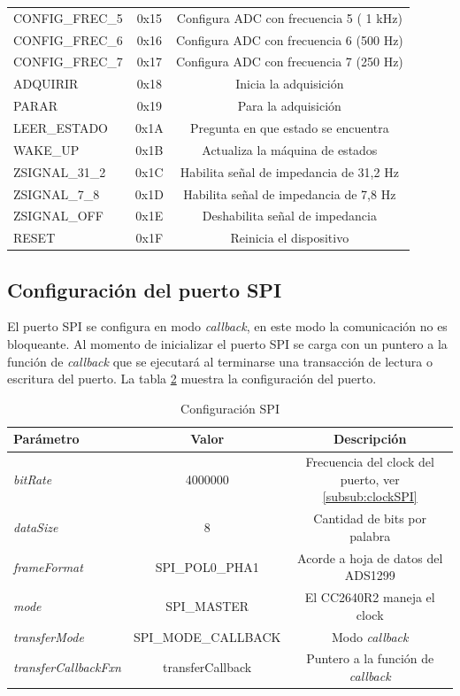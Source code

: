\begin{table}[h]
\begin{tabular}{l c c}
CONFIG\_FREC\_5    &	0x15	&	Configura ADC con frecuencia 5 ( 1 kHz)\\
CONFIG\_FREC\_6    &	0x16	&	Configura ADC con frecuencia 6 (500 Hz)\\
CONFIG\_FREC\_7	&	0x17	&	Configura ADC con frecuencia 7 (250 Hz)\\
ADQUIRIR			&	0x18	&	Inicia la adquisición\\
PARAR           	&	0x19	&	Para la adquisición\\
LEER\_ESTADO		&	0x1A	&	Pregunta en que estado se encuentra\\
WAKE\_UP       	&	0x1B	&	Actualiza la máquina de estados\\
ZSIGNAL\_31\_2	&	0x1C	&	Habilita señal de impedancia de 31,2 Hz\\
ZSIGNAL\_7\_8	&	0x1D	&	Habilita señal de impedancia de 7,8 Hz\\
ZSIGNAL\_OFF		&	0x1E	&	Deshabilita señal de impedancia\\
RESET			&	0x1F	&	Reinicia el dispositivo\\

\bottomrule
\hline
\end{tabular}
\label{tab:Comandos}
\end{table}


\subsection{Configuración del puerto SPI}
El puerto SPI se configura en modo \textit{callback}, en este modo la comunicación no es bloqueante. Al momento de inicializar el puerto SPI se carga con un puntero a la función de \textit{callback} que se ejecutará al terminarse una transacción de lectura o escritura del puerto. La tabla \ref{tab:ParamSPI} muestra la configuración del puerto.

\begin{table}[h]
\centering
\caption[Configuración SPI]{Configuración SPI}
\begin{tabular}{l c c}
\toprule
\textbf{Parámetro} & \textbf{Valor} & \textbf{Descripción}\\
\midrule
\textit{bitRate}              & 4000000 & Frecuencia del clock del puerto, ver \ref{subsub:clockSPI}\\ 
\textit{dataSize}             & 8 & Cantidad de bits por palabra\\
\textit{frameFormat}          & SPI\_POL0\_PHA1 & Acorde a hoja de datos del ADS1299 \citep{PART:ADS1299}\\
\textit{mode}                 & SPI\_MASTER & El CC2640R2 maneja el clock\\
\textit{transferMode}         & SPI\_MODE\_CALLBACK & Modo \textit{callback}\\
\textit{transferCallbackFxn}  & transferCallback & Puntero a la función de \textit{callback}\\
\bottomrule
\hline
\end{tabular}
\label{tab:ParamSPI}
\end{table}
